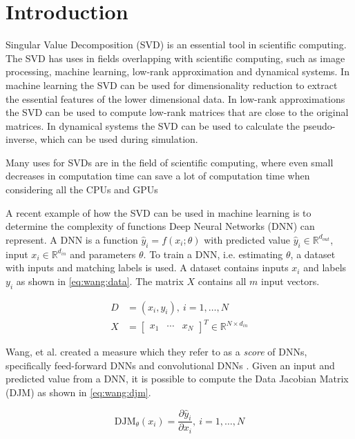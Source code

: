 \chapter {Introduction}

Singular Value Decomposition (SVD) is an essential tool in scientific computing. The SVD has uses in fields overlapping with scientific computing, such as image processing, machine learning, low-rank approximation and dynamical systems. In machine learning the SVD can be used for dimensionality reduction to extract the essential features of the lower dimensional data. In low-rank approximations the SVD can be used to compute low-rank matrices that are close to the original matrices. In dynamical systems the SVD can be used to calculate the pseudo-inverse, which can be used during simulation.
 

Many uses for SVDs are in the field of scientific computing, where even small decreases in computation time can save a lot of computation time when considering all the CPUs and GPUs 

A recent example of how the SVD can be used in machine learning is to determine the complexity of functions Deep Neural Networks (DNN) can represent. A DNN is a function $\hat y_i = f(x_i; \theta)$ with predicted value $\hat y_i \in \mathbb{R}^{d_{out}}$, input $x_i \in \mathbb{R}^{d_{in}}$ and parameters $\theta$. To train a DNN, i.e. estimating $\theta$, a dataset with inputs and matching labels is used. A dataset contains inputs $x_i$ and labels $y_i$ as shown in \eqref{eq:wang:data}. The matrix $X$ contains all $m$ input vectors.

\begin{equation} \label{eq:wang:data}
  \begin{split}
    D &= {(x_i,y_i)},\ i=1,\dotsc,N \\
    X &=
    \begin{bmatrix}
      x_1 & \cdots & x_N
    \end{bmatrix}^T \in \mathbb{R}^{N \times d_{in}}
  \end{split}
\end{equation}

Wang, et al. created a measure which they refer to as a \textit{score} of DNNs, specifically feed-forward DNNs and convolutional DNNs \cite{icml16:wang:edjm}. Given an input and predicted value from a DNN, it is possible to compute the Data Jacobian Matrix (DJM) \cite{icml16:wang:edjm} as shown in \eqref{eq:wang:djm}.

\begin{equation} \label{eq:wang:djm}
    \mathrm{DJM}_{\theta}(x_i) = \frac{\partial \hat y_i}{\partial x_i},\ i=1, \dots, N
\end{equation}

